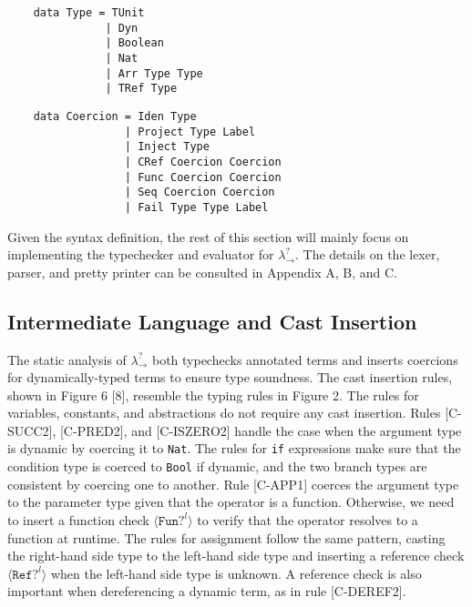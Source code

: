 \begin{lstlisting}
    data Type = TUnit         
               | Dyn            
               | Boolean          
               | Nat            
               | Arr Type Type 
               | TRef Type      
\end{lstlisting}

\begin{lstlisting}
    data Coercion = Iden Type              
                  | Project Type Label     
                  | Inject Type             
                  | CRef Coercion Coercion  
                  | Func Coercion Coercion  
                  | Seq Coercion Coercion   
                  | Fail Type Type Label
\end{lstlisting}  

Given the syntax definition, the rest of this section will mainly focus on 
implementing the typechecker and 
evaluator for $\lambda ^? _{\rightarrow}$. The details on the 
lexer, parser, and pretty printer can be consulted in 
Appendix A, B, and C.

\subsection{Intermediate Language and Cast Insertion}
The static analysis of $\lambda ^? _{\rightarrow}$ both 
typechecks annotated terms and inserts coercions for 
dynamically-typed terms to ensure type soundness. The cast insertion 
rules, shown in Figure 6 [8], resemble the typing rules in 
Figure 2. 
The rules for variables, constants, and 
abstractions do not require any cast insertion. Rules {\scriptsize{[C-SUCC2]}}, 
{\scriptsize{[C-PRED2]}}, and {\scriptsize{[C-ISZERO2]}} handle the 
case when the argument type is dynamic by coercing it to \texttt{Nat}. 
The rules for \texttt{if} expressions make sure that the condition 
type is coerced to \texttt{Bool} if dynamic, and the two branch 
types are consistent by coercing one to another. Rule 
{\scriptsize{[C-APP1]}} coerces the argument type to the parameter 
type given that the operator is a function. Otherwise, we need to 
insert a function check $\langle \texttt{Fun}? ^l \rangle$ to verify 
that the operator resolves to a function at runtime. The rules for 
assignment follow the same pattern, casting the right-hand side type 
to the left-hand side type and inserting a reference check 
$\langle \texttt{Ref}? ^l \rangle$ when the left-hand side type is 
unknown. A reference check is also important when dereferencing a 
dynamic term, as in rule {\scriptsize{[C-DEREF2]}}.


